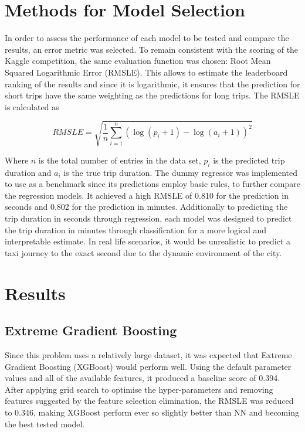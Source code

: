 \documentclass[a4paper]{article}
\begin{document}
\section{Methods for Model Selection}
In order to assess the performance of each model to be tested and compare the
results, an error metric was selected. To remain consistent with the scoring of
the Kaggle competition, the same evaluation function was chosen: Root Mean
Squared Logarithmic Error (RMSLE). This allows to estimate the leaderboard
ranking of the results and since it is logarithmic, it ensures that the
prediction for short trips have the same weighting as the predictions for long
trips. The RMSLE is calculated as

\[RMSLE = \sqrt{\frac{1}{n}\sum_{i=1}^n(\log(p_i+1) - \log(a_i+1))^2}\]

Where $n$ is the total number of entries in the data set, $p_i$ is the predicted trip
duration and $a_i$ is the true trip duration.  The dummy regressor was implemented
to use as a benchmark since its predictions employ basic rules, to further
compare the regression models. It achieved a high RMSLE of 0.810 for the
prediction in seconds and 0.802 for the prediction in minutes.  Additionally to
predicting the trip duration in seconds through regression, each model was
designed to predict the trip duration in minutes through classification for a
more logical and interpretable estimate. In real life scenarios, it would be
unrealistic to predict a taxi journey to the exact second due to the dynamic
environment of the city.

\section{Results}

\subsection{Extreme Gradient Boosting}
Since this problem uses a relatively large dataset, it was expected that Extreme
Gradient Boosting (XGBoost) would perform well. Using the default parameter
values and all of the available features, it produced a baseline score of 0.394.
After applying grid search to optimise the hyper-parameters and removing features
suggested by the feature selection elimination, the RMSLE was reduced to 0.346,
making XGBoost perform ever so slightly better than NN and becoming the best
tested model.
\end{document}
